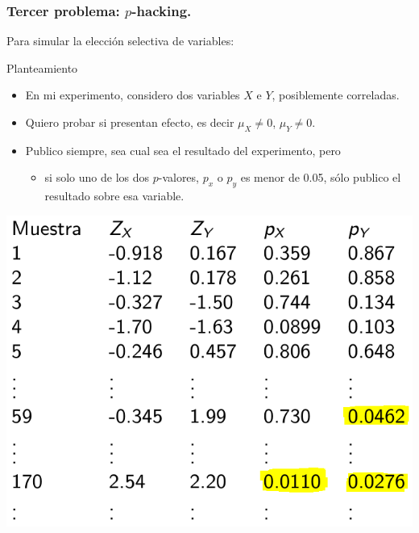 \documentclass[9pt]{beamer}
\begin{document}
\begin{frame}
  \frametitle{Tercer problema: $p$-hacking.}
  Para simular la elección selectiva de variables:\\ 
  \begin{block}{Planteamiento}
    \begin{itemize}
    \item     En mi experimento, considero dos variables $X$ e $Y$,
      posiblemente correladas.
    \item Quiero probar si presentan efecto, es decir $\mu_X \neq 0$,
      $\mu_Y\neq 0$.
    \item   Publico siempre, sea cual sea el resultado del
      experimento, pero
      \begin{itemize}
      \item si solo uno de los dos $p$-valores, $p_x$ o $p_y$ es menor
        de 0.05, sólo publico el resultado sobre esa variable.
      \end{itemize}
    \end{itemize}

  \end{block}
  \begin{center}
    \includegraphics[width=0.5\linewidth]{images/select_variable-3} 
  \end{center}
\end{frame}
\end{document}
